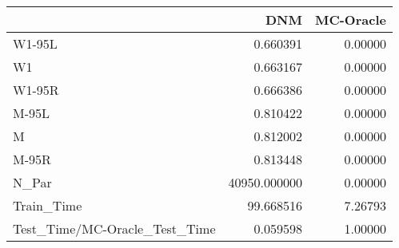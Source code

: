 \begin{tabular}{lrr}
\toprule
{} &           DNM &  MC-Oracle \\
\midrule
W1-95L                        &      0.660391 &    0.00000 \\
W1                            &      0.663167 &    0.00000 \\
W1-95R                        &      0.666386 &    0.00000 \\
M-95L                         &      0.810422 &    0.00000 \\
M                             &      0.812002 &    0.00000 \\
M-95R                         &      0.813448 &    0.00000 \\
N\_Par                         &  40950.000000 &    0.00000 \\
Train\_Time                    &     99.668516 &    7.26793 \\
Test\_Time/MC-Oracle\_Test\_Time &      0.059598 &    1.00000 \\
\bottomrule
\end{tabular}
